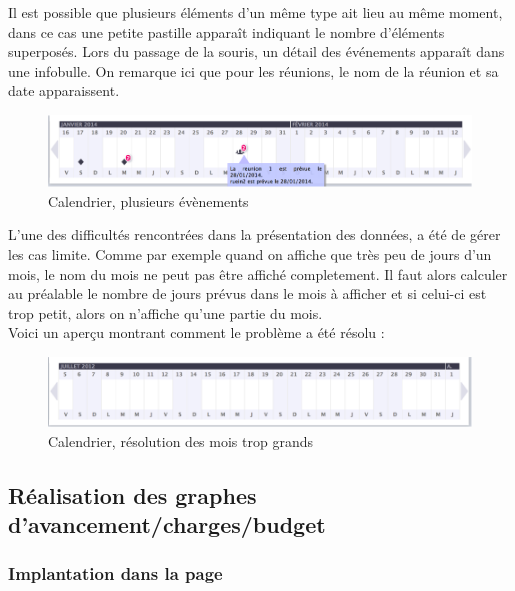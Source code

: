 \documentclass[12pt]{report}
\begin{document}
Il est possible que plusieurs éléments d’un même type ait lieu au même moment, dans ce cas une petite pastille apparaît indiquant le nombre d’éléments superposés. Lors du passage de la souris, un détail des événements apparaît dans une infobulle. On remarque ici que pour les réunions, le nom de la réunion et sa date apparaissent.\\
	
\begin{figure}[H]
	\centering
	\includegraphics[width=1\textwidth]{pictures/matthieu/m_calendar_2.png}
	\caption{Calendrier, plusieurs évènements}
	\label{m3}
\end{figure}
	
	L’une des difficultés rencontrées dans la présentation des données, a été de gérer les cas limite. Comme par exemple quand on affiche que très peu de jours d’un mois, le nom du mois ne peut pas être affiché completement. Il faut alors calculer au préalable le nombre de jours prévus dans le mois à afficher et si celui-ci est trop petit, alors on n’affiche qu’une partie du mois.\\

Voici un aperçu montrant comment le problème a été résolu :\\
	
	\begin{figure}[H]
	\centering
	\includegraphics[width=1\textwidth]{pictures/matthieu/m_calendar_3.png}
	\caption{Calendrier, résolution des mois trop grands}
	\label{m4}
\end{figure}

	\subsection{Réalisation des graphes d'avancement/charges/budget}
	
	\subsubsection{Implantation dans la page}
	
\end{document}

